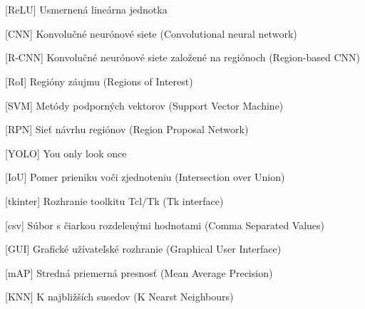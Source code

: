 \cleardoublepage
\chapter*{\listofabbrevname}
{}

\begin{acronym}[KolikMista]

		[ReLU]
		{Usmernená lineárna jednotka}

		[CNN]
		{Konvolučné neurónové siete (Convolutional neural network)}

		[R-CNN]
		{Konvolučné neurónové siete založené na regiónoch (Region-based CNN)}

		[RoI]
		{Regióny záujmu (Regions of Interest)}

		[SVM]
		{Metódy podporných vektorov (Support Vector Machine)}

		[RPN]
		{Sieť návrhu regiónov (Region Proposal Network)}

		[YOLO]
		{You only look once}
	
		[IoU]
		{Pomer prieniku voči zjednoteniu (Intersection over Union)}
	
		[tkinter]
		{Rozhranie toolkitu Tcl/Tk (Tk interface)}

		[csv]
		{Súbor s čiarkou rozdelenými hodnotami (Comma Separated Values)}

		[GUI]
		{Grafické užívateľské rozhranie (Graphical User Interface)}

		[mAP]
		{Stredná priemerná presnosť (Mean Average Precision)}

		[KNN]
		{K najbližších susedov (K Nearst Neighbours)}




\end{acronym}
